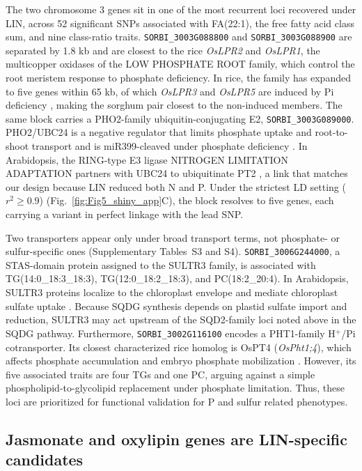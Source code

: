 \documentclass[9pt,twocolumn,twoside]{rilabRxiv}
\begin{document}
The two chromosome 3 genes sit in one of the most recurrent loci recovered under LIN, across 52 significant SNPs associated with FA(22:1), the free fatty acid class sum, and nine class-ratio traits. \texttt{SORBI\_3003G088800} and \texttt{SORBI\_3003G088900} are separated by 1.8 kb and are closest to the rice \textit{OsLPR2} and \textit{OsLPR1}, the multicopper oxidases of the LOW PHOSPHATE ROOT family, which control the root meristem response to phosphate deficiency. In rice, the family has expanded to five genes within 65 kb, of which \textit{OsLPR3} and \textit{OsLPR5} are induced by Pi deficiency \citep{Cao2016OsLPR}, making the sorghum pair closest to the non-induced members. The same block carries a PHO2-family ubiquitin-conjugating E2, \texttt{SORBI\_3003G089000}. PHO2/UBC24 is a negative regulator that limits phosphate uptake and root-to-shoot transport and is miR399-cleaved under phosphate deficiency \citep{Aung2006PHO2, Huang2013PHO2}. In Arabidopsis, the RING-type E3 ligase NITROGEN LIMITATION ADAPTATION partners with UBC24 to ubiquitinate PT2 \citep{Park2014NLA}, a link that matches our design because LIN reduced both N and P. Under the strictest LD setting ($r^2 \geq 0.9$) (Fig.~\ref{fig:Fig5_shiny_app}C), the block resolves to five genes, each carrying a variant in perfect linkage with the lead SNP.

Two transporters appear only under broad transport terms, not phosphate- or sulfur-specific ones (Supplementary Tables~S3 and S4). \texttt{SORBI\_3006G244000}, a STAS-domain protein assigned to the SULTR3 family, is associated with TG(14:0\_18:3\_18:3), TG(12:0\_18:2\_18:3), and PC(18:2\_20:4). In Arabidopsis, SULTR3 proteins localize to the chloroplast envelope and mediate chloroplast sulfate uptake \citep{Chen2019SULTR3}. Because SQDG synthesis depends on plastid sulfate import and reduction, SULTR3 may act upstream of the SQD2-family loci noted above in the SQDG pathway. Furthermore, \texttt{SORBI\_3002G116100} encodes a PHT1-family H$^+$/Pi cotransporter. Its closest characterized rice homolog is OsPT4 (\textit{OsPht1;4}), which affects phosphate accumulation and embryo phosphate mobilization \citep{Ye2015OsPT4,Zhang2015OsPht14}. However, its five associated traits are four TGs and one PC, arguing against a simple phospholipid-to-glycolipid replacement under phosphate limitation. Thus, these loci are prioritized for functional validation for P and sulfur related phenotypes.

\subsection*{Jasmonate and oxylipin genes are LIN-specific candidates}
\end{document}
